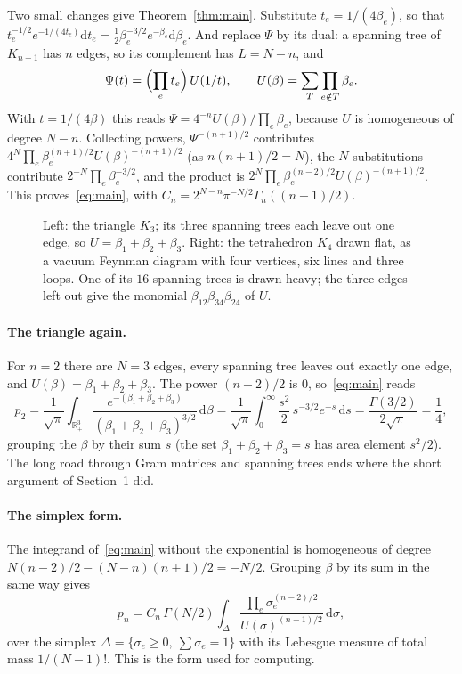 \documentclass[11pt]{article}
\theoremstyle{remark}
\newcommand{\R}{\mathbb{R}}
\newcommand{\dd}{\mathrm{d}}
\begin{document}
Two small changes give Theorem~\ref{thm:main}. Substitute $t_e=1/(4\beta_e)$, so that
$t_e^{-1/2}e^{-1/(4t_e)}\dd t_e=\tfrac12\beta_e^{-3/2}e^{-\beta_e}\dd\beta_e$. And replace $\Psi$ by its
dual: a spanning tree of $K_{n+1}$ has $n$ edges, so its complement has $L=N-n$, and
\begin{equation}\label{eq:dual}
\Psi(t)=\Bigl(\prod_e t_e\Bigr)\,U(1/t),\qquad U(\beta)=\sum_T\prod_{e\notin T}\beta_e .
\end{equation}
With $t=1/(4\beta)$ this reads $\Psi=4^{-n}U(\beta)/\prod_e\beta_e$, because $U$ is homogeneous of degree
$N-n$. Collecting powers, $\Psi^{-(n+1)/2}$ contributes $4^N\prod_e\beta_e^{(n+1)/2}U(\beta)^{-(n+1)/2}$ (as
$n(n+1)/2=N$), the $N$ substitutions contribute $2^{-N}\prod_e\beta_e^{-3/2}$, and the product is
$2^N\prod_e\beta_e^{(n-2)/2}U(\beta)^{-(n+1)/2}$. This proves~\eqref{eq:main}, with
$C_n=2^{N-n}\pi^{-N/2}\Gamma_n((n+1)/2)$.

\begin{figure}[ht]
\centering

\caption{Left: the triangle $K_3$; its three spanning trees each leave out one edge, so
$U=\beta_1+\beta_2+\beta_3$. Right: the tetrahedron $K_4$ drawn flat, as a vacuum Feynman diagram with
four vertices, six lines and three loops. One of its $16$ spanning trees is drawn heavy; the three edges
left out give the monomial $\beta_{12}\beta_{34}\beta_{24}$ of $U$.}
\label{fig:k4}
\end{figure}

\paragraph{The triangle again.} For $n=2$ there are $N=3$ edges, every spanning tree leaves out exactly
one edge, and $U(\beta)=\beta_1+\beta_2+\beta_3$. The power $(n-2)/2$ is $0$, so~\eqref{eq:main} reads
\[
p_2=\frac1{\sqrt\pi}\int_{\R_+^3}\frac{e^{-(\beta_1+\beta_2+\beta_3)}}{(\beta_1+\beta_2+\beta_3)^{3/2}}\,\dd\beta
=\frac1{\sqrt\pi}\int_0^\infty\frac{s^2}{2}\,s^{-3/2}e^{-s}\,\dd s=\frac{\Gamma(3/2)}{2\sqrt\pi}=\frac14,
\]
grouping the $\beta$ by their sum $s$ (the set $\beta_1+\beta_2+\beta_3=s$ has area element $s^2/2$). The
long road through Gram matrices and spanning trees ends where the short argument of Section~1 did.

\paragraph{The simplex form.} The integrand of~\eqref{eq:main} without the exponential is homogeneous of
degree $N(n-2)/2-(N-n)(n+1)/2=-N/2$. Grouping $\beta$ by its sum in the same way gives
\begin{equation}\label{eq:simplex}
p_n=C_n\,\Gamma(N/2)\int_{\Delta}\frac{\prod_e\sigma_e^{(n-2)/2}}{U(\sigma)^{(n+1)/2}}\,\dd\sigma,
\end{equation}
over the simplex $\Delta=\{\sigma_e\ge0,\ \sum\sigma_e=1\}$ with its Lebesgue measure of total mass
$1/(N-1)!$. This is the form used for computing.
\end{document}
